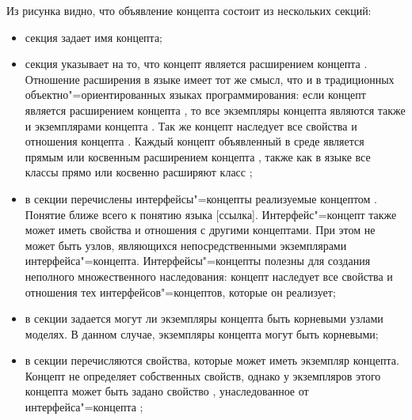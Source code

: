 Из рисунка видно, что объявление концепта состоит из нескольких секций:
\begin{itemize}
 \item секция  задает имя концепта;

 \item секция  указывает на то, что концепт является расширением концепта .
 Отношение расширения в языке  имеет тот же смысл, что и в традиционных объектно"=ориентированных
 языках программирования: если концепт  является расширением концепта , то все экземпляры концепта 
 являются также и экземплярами концепта . Так же концепт  наследует все свойства и отношения концепта
 .  Каждый концепт объявленный в среде \MPS{} является прямым или косвенным расширением концепта
 ,  также как в языке  все классы прямо или косвенно расширяют класс ;

 \item в секции  перечислены интерфейсы"=концепты реализуемые
 концептом . Понятие  ближе всего к понятию  языка  [ссылка].
 Интерфейс"=концепт также может иметь свойства и отношения с другими концептами. При этом не может быть узлов,
 являющихся непосредственными экземплярами интерфейса"=концепта. Интерфейсы"=концепты полезны для создания неполного
 множественного наследования: концепт наследует все свойства и отношения тех интерфейсов"=концептов, которые он
 реализует;

 \item в секции  задается могут ли экземпляры концепта быть корневыми узлами моделях. В
 данном случае, экземпляры концепта  могут быть корневыми;

 \item в секции  перечисляются свойства, которые может иметь экземпляр концепта. Концепт 
 не определяет собственных свойств, однако у экземпляров этого концепта может быть задано свойство 
, унаследованное от интерфейса"=концепта ;


\end{itemize}
